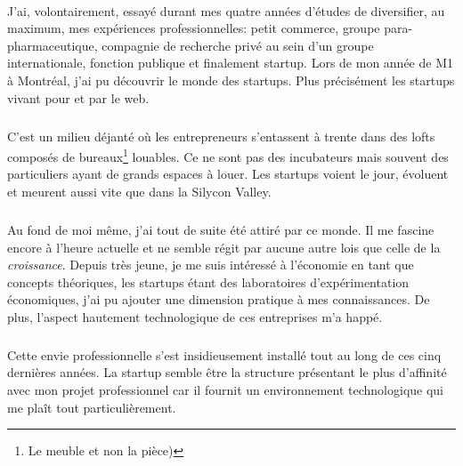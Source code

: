 \documentclass[11pt, a4paper ]{article}
\begin{document}
\begin{spacing}{1.5}
\paragraph{}
J'ai, volontairement, essayé durant mes quatre années d'études de diversifier, au maximum, mes expériences professionnelles: petit commerce, groupe para-pharmaceutique, compagnie de recherche privé au sein d'un groupe internationale, fonction publique et finalement startup. 
Lors de mon année de M1 à Montréal, j'ai pu découvrir le monde des startups. Plus précisément les startups vivant pour et par le web. 
\subparagraph{}
C'est un milieu déjanté où les entrepreneurs s'entassent à trente dans des lofts composés de bureaux\footnote{Le meuble et non la pièce)} louables. Ce ne sont pas des incubateurs mais souvent des particuliers ayant de grands espaces à louer. Les startups voient le jour, évoluent et meurent aussi vite que dans la Silycon Valley. 
\subparagraph{}
Au fond de moi même, j'ai tout de suite été attiré par ce monde. Il me fascine encore à l'heure actuelle et ne semble régit par aucune autre lois que celle de la \emph{croissance}. Depuis très jeune, je me suis intéressé à l'économie en tant que concepts théoriques, les startups étant des laboratoires d'expérimentation économiques, j'ai pu ajouter une dimension pratique à mes connaissances. De plus, l'aspect hautement technologique de ces entreprises m'a happé. 
\subparagraph{}
Cette envie professionnelle s'est insidieusement installé tout au long de ces cinq dernières années. La startup semble être la structure présentant le plus d'affinité avec mon projet professionnel car il fournit un environnement technologique qui me plaît tout particulièrement.


\end{spacing}
\end{document}
